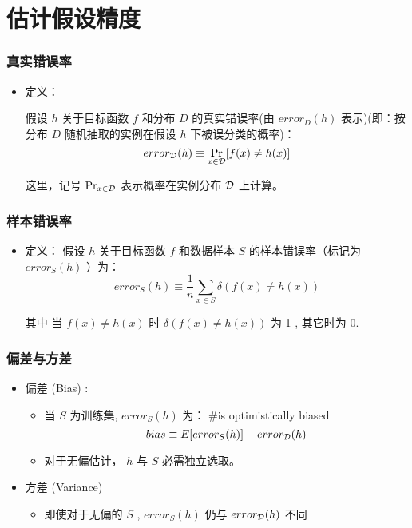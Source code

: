 \documentclass{beamer}
\begin{document}
\section{估计假设精度}
\label{sec-2}
\begin{frame}
\frametitle{真实错误率}
\label{sec-2-1}

\begin{itemize}
\item 定义： 

  假设 $h$ 关于目标函数 $f$ 和分布 $D$ 的真实错误率(由 $error_D(h)$ 表示)(即：按分布 $D$ 随机抽取的实例在假设 $h$ 下被误分类的概率)：
    $$error_{\cal{D}}(h) \equiv \Pr_{x \in \cal{D}}[f(x) \neq h(x)]$$

  这里，记号 $\Pr_{x \in \cal{D}}$ 表示概率在实例分布 $\cal{D}$ 上计算。
\end{itemize}
\end{frame}
\begin{frame}
\frametitle{样本错误率}
\label{sec-2-2}

\begin{itemize}
\item 定义： 
  假设 $h$ 关于目标函数 $f$ 和数据样本 $S$ 的样本错误率（标记为 $error_S(h)$ ）为：
  \[error_{S}(h) \equiv \frac{1}{n}\sum_{x \in S}\delta(f(x) \neq h(x))\]

  其中 当 $f(x) \neq h(x)$ 时 $\delta(f(x) \neq h(x))$ 为 1 , 其它时为 0.
\end{itemize}
\end{frame}
\begin{frame}
\frametitle{偏差与方差}
\label{sec-2-3}


\begin{itemize}
\item 偏差 (Bias) :
\begin{itemize}
\item 当 $S$ 为训练集, $error_{S}(h)$ 为：   \#is optimistically biased
        \[bias \equiv E[ error_{S}(h)] - error_{\cal{D}}(h)\]
\item 对于无偏估计， $h$ 与 $S$ 必需独立选取。
\end{itemize}
\item 方差 (Variance)
\begin{itemize}
\item 即使对于无偏的 $S$ , $error_{S}(h)$ 仍与 $error_{\cal{D}}(h)$ 不同
\end{itemize}
\end{itemize}
\end{frame}
\end{document}
